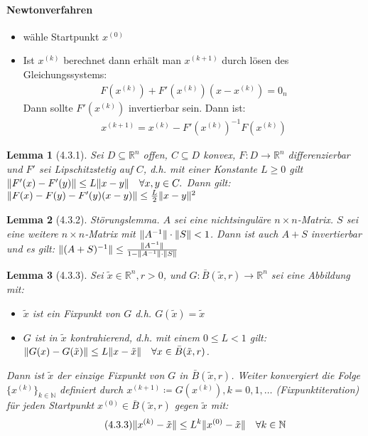 \documentclass[ngerman,halfparskip]{scrartcl}
\DeclarePairedDelimiter{\norm}{\lVert}{\rVert}
\newtheorem*{lemma}{Lemma}
\theoremstyle{definition}
\newcommand*{\R}{\mathbb{R}}      %
\begin{document}
\paragraph{Newtonverfahren}
\begin{itemize}
\item wähle Startpunkt $x^{(0)}$
\item Ist $x^{(k)}$ berechnet dann erhält man $x^{(k+1)}$ durch lösen des Gleichungssystems:
\begin{gather*}\tag{4.3.1}
F(x^{(k)})+F'(x^{(k)})(x-x^{(k)})=0_n
\end{gather*}
Dann sollte $F'(x^{(k)})$ invertierbar sein. Dann ist:
\begin{gather*}\tag{4.3.2}
x^{(k+1)}=x^{(k)}-F'(x^{(k)})^{-1}F(x^{(k)})
\end{gather*}
\end{itemize}

\begin{lemma}[4.3.1] Sei $D\subseteq \R^n$ offen, $C\subseteq D$ konvex, $F\colon D\rightarrow \R^n$ differenzierbar und $F'$ sei Lipschitzstetig auf $C$, d.h. mit einer Konstante $L\geq 0$ gilt $\norm{F'(x)-F'(y)}\leq L\norm{x-y} \quad \forall x,y\in C.$ Dann gilt: $\norm{F(x)-F(y)-F'(y)(x-y)}\leq \frac L2 \norm{x-y}^2$

\end{lemma}

\begin{lemma}[4.3.2] Störungslemma. $A$ sei eine nichtsinguläre $n\times n$-Matrix. $S$ sei eine weitere $n\times n$-Matrix mit $\norm{A^{-1}}\cdot \norm{S}<1$. Dann ist auch $A+S$ invertierbar und es gilt: $\norm{(A+S)^{-1}}\leq \frac {\norm{A^{-1}}}{1-\norm{A^{-1}}\cdot \norm{S}}$
\end{lemma}

\begin{lemma}[4.3.3] Sei $\tilde x \in \R^n, r>0$, und $G:\bar B(\tilde x,r)\rightarrow \R^n$ sei eine Abbildung mit: 
\begin{itemize}
\item [a)]$\tilde x$ ist ein Fixpunkt von $G$ d.h. $G(\tilde x)=\tilde x$
\item [b)] $G$ ist in $\tilde x$ kontrahierend, d.h. mit einem $0\leq L < 1$ gilt: $\norm{G(x)-G(\tilde x)}\leq L \norm{x-\tilde x} \quad \forall x\in\bar B(\tilde x,r)$.
\end{itemize}
Dann ist $\tilde x$ der einzige Fixpunkt von $G$ in $\bar B (\tilde x,r)$. Weiter konvergiert die Folge $\{x^{(k)}\}_{k\in\mathbb N}$ definiert durch $x^{(k+1)}\coloneqq G(x^{(k)}), k=0,1,\ldots$ (Fixpunktiteration) für jeden Startpunkt $x^{(0)}\in\bar B(\tilde x,r)$ gegen $\tilde x$ mit:
\begin{gather*}\tag{4.3.3}
\norm{x^{(k)}-\tilde x}\leq L^k \norm{x^{(0)}-\tilde x} \quad \forall k\in\mathbb N
\end{gather*}
\end{lemma}
\end{document}
